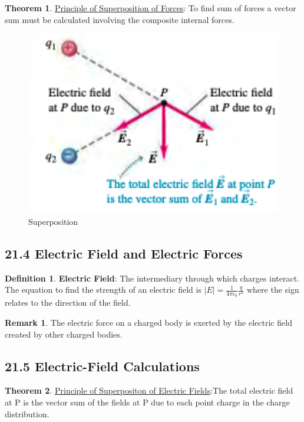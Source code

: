 \documentclass[12pt]{amsart}
\theoremstyle{definition}
\newtheorem{theorem}{Theorem}  %
\newtheorem{definition}{Definition} %
\newtheorem*{remark}{Remark}        %
\numberwithin{equation}{theorem}    %
\begin{document}
\begin{theorem}
    \underline{Principle of Superposition of Forces}: To find sum of forces a 
    vector sum must be calculated involving the composite internal forces.
\end{theorem}

\begin{figure}[H]
    \centering
    \includegraphics[width=5in]{Media/superposition.png}
    \caption{Superposition}
    \label{Superposition}
\end{figure}

\subsection*{21.4 Electric Field and Electric Forces}

\begin{definition}
    \textbf{Electric Field}: The intermediary through which charges interact. 
    The equation to find the strength of an electric field is $|E| = \frac{1}{4\pi\epsilon_0}\frac{q}{r^2}$
    where the sign relates to the direction of the field.
    \begin{remark}
        The electric force on a charged body is exerted by the electric field 
        created by other charged bodies.
    \end{remark}
\end{definition}

\subsection*{21.5 Electric-Field Calculations}

\begin{theorem}
    \underline{Principle of Superpositon of Electric Fields}:The total electric 
    field at P is the vector sum of the fields at P due to each point charge 
    in the charge distribution. 
\end{theorem}
\end{document}
